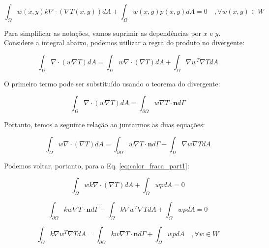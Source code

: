         \begin{equation}
            \int_\Omega w(x,y) k \nabla \cdot \left(\nabla T(x,y)\right) dA + \int_\Omega w(x,y) p(x,y) dA = 0 \quad, \forall w(x,y) \in W
            \label{eq:calor_fraca_part1}
        \end{equation}

        Para simplificar as notações, vamos suprimir as dependências por $x$ e $y$. Considere a integral abaixo, podemos utilizar a regra do produto no divergente:

        \begin{equation}
            \int_\Omega \nabla \cdot \left( w\nabla T \right) dA  = 
            \int_\Omega w \nabla \cdot \left(\nabla T\right) dA + 
            \int_\Omega \nabla w^T \nabla T  dA
        \end{equation}

        O primeiro termo pode ser substituído usando o teorema do divergente:

        \begin{equation}
            \int_\Omega \nabla \cdot \left( w\nabla T \right) dA  = 
            \int_{\partial \Omega} w\nabla T \cdot \mathbf{n} d\Gamma
        \end{equation}

        Portanto, temos a seguinte relação ao juntarmos as duas equações:

        \begin{equation}
            \int_\Omega w \nabla \cdot \left(\nabla T\right) dA = 
            \int_{\partial \Omega} w\nabla T \cdot \mathbf{n} d\Gamma -
            \int_\Omega \nabla w \nabla T  dA
        \end{equation}

        Podemos voltar, portanto, para a Eq. \eqref{eq:calor_fraca_part1}:

        \begin{equation*}
            \int_\Omega w k \nabla \cdot \left(\nabla T\right) dA + \int_\Omega w p dA = 0
        \end{equation*}

        \begin{equation*}
            \int_{\partial \Omega} k w\nabla T \cdot \mathbf{n} d\Gamma -
            \int_\Omega k \nabla w^T \nabla T  dA + \int_\Omega w p dA = 0
        \end{equation*}

        \begin{equation}
            \int_\Omega k \nabla w^T \nabla T  dA = 
            \int_{\partial \Omega} k w\nabla T \cdot \mathbf{n} d\Gamma
             + \int_\Omega w p dA \quad ,\forall w \in W
        \end{equation}

